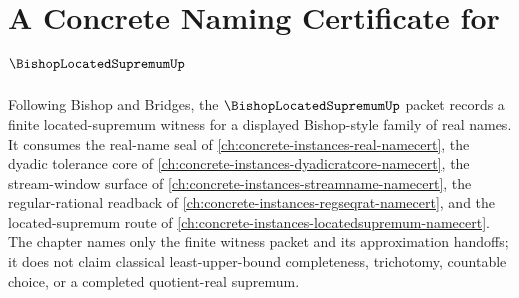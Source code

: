 \chapter{A Concrete Naming Certificate for $\BishopLocatedSupremumUp$}
\label{ch:concrete-instances-bishop-located-supremum-namecert}

Following Bishop and Bridges, the $\BishopLocatedSupremumUp$ packet records a finite located-supremum witness for a displayed Bishop-style family of real names. It consumes the real-name seal of \autoref{ch:concrete-instances-real-namecert}, the dyadic tolerance core of \autoref{ch:concrete-instances-dyadicratcore-namecert}, the stream-window surface of \autoref{ch:concrete-instances-streamname-namecert}, the regular-rational readback of \autoref{ch:concrete-instances-regseqrat-namecert}, and the located-supremum route of \autoref{ch:concrete-instances-locatedsupremum-namecert}. The chapter names only the finite witness packet and its approximation handoffs; it does not claim classical least-upper-bound completeness, trichotomy, countable choice, or a completed quotient-real supremum.

